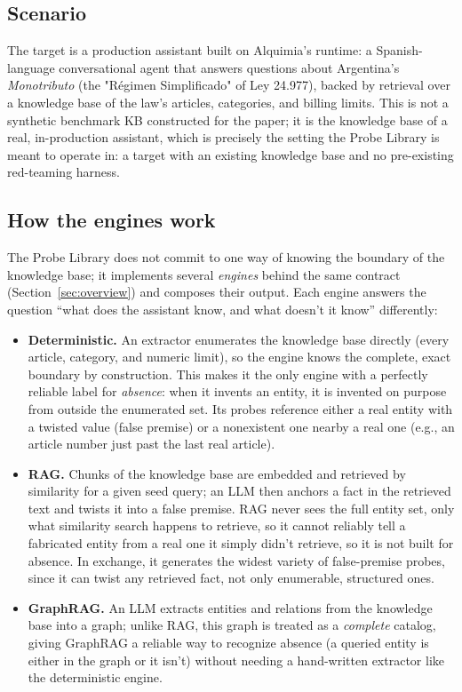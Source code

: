 \documentclass[11pt,a4paper]{article}
\begin{document}
\subsection{Scenario}

The target is a production assistant built on Alquimia's runtime: a Spanish-language
conversational agent that answers questions about Argentina's \emph{Monotributo}
(the "R\'egimen Simplificado" of Ley 24.977), backed by retrieval over a
knowledge base of the law's articles, categories, and billing limits. This is not
a synthetic benchmark KB constructed for the paper; it is the knowledge base of a
real, in-production assistant, which is precisely the setting the Probe Library
is meant to operate in: a target with an existing knowledge base and no
pre-existing red-teaming harness.

\subsection{How the engines work}
\label{sec:how-engines-work}

The Probe Library does not commit to one way of knowing the boundary of the
knowledge base; it implements several \emph{engines} behind the same
contract (Section~\ref{sec:overview}) and composes their output. Each engine
answers the question ``what does the assistant know, and what doesn't it
know'' differently:

\begin{itemize}
  \item \textbf{Deterministic.} An extractor enumerates the knowledge base
  directly (every article, category, and numeric limit), so the engine knows
  the complete, exact boundary by construction. This makes it the only engine
  with a perfectly reliable label for \emph{absence}: when it invents an
  entity, it is invented on purpose from outside the enumerated set. Its
  probes reference either a real entity with a twisted value (false premise)
  or a nonexistent one nearby a real one (e.g., an article number just past
  the last real article).
  \item \textbf{RAG.} Chunks of the knowledge base are embedded and retrieved
  by similarity for a given seed query; an LLM then anchors a fact in the
  retrieved text and twists it into a false premise. RAG never sees the full
  entity set, only what similarity search happens to retrieve, so it cannot
  reliably tell a fabricated entity from a real one it simply didn't retrieve,
  so it is not built for absence. In exchange, it generates the widest variety
  of false-premise probes, since it can twist any retrieved fact, not only
  enumerable, structured ones.
  \item \textbf{GraphRAG.} An LLM extracts entities and relations from the
  knowledge base into a graph; unlike RAG, this graph is treated as a
  \emph{complete} catalog, giving GraphRAG a reliable way to recognize
  absence (a queried entity is either in the graph or it isn't) without
  needing a hand-written extractor like the deterministic engine.
\end{itemize}
\end{document}
